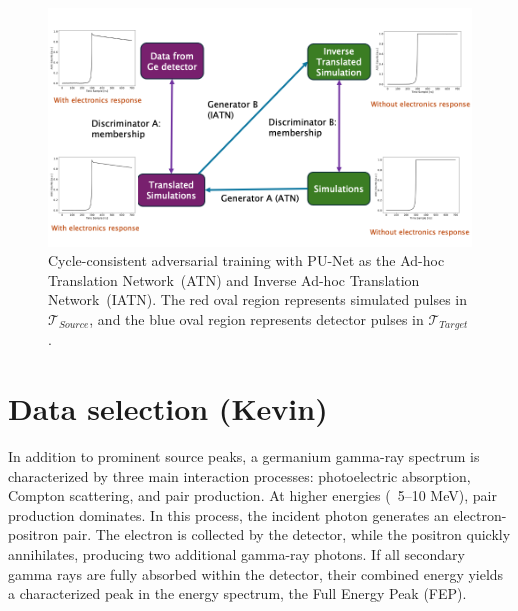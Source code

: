 \begin{figure}[htb!]
    \includegraphics[width=0.99\linewidth]{ch7/figs/cycle_gan_training.png}
    \caption{Cycle-consistent adversarial training with PU-Net as the Ad-hoc Translation Network~(ATN) and Inverse Ad-hoc Translation Network~(IATN). The red oval region represents simulated pulses in $\mathcal{T}_{Source}$, and the blue oval region represents detector pulses in $\mathcal{T}_{Target}$.}
   \label{fig:network_training}
\end{figure}





\section{Data selection (Kevin)}

In addition to prominent source peaks, a germanium gamma-ray spectrum is characterized by three main interaction processes: photoelectric absorption, Compton scattering, and pair production. At higher energies (~5–10 MeV), pair production dominates. In this process, the incident photon generates an electron-positron pair. The electron is collected by the detector, while the positron quickly annihilates, producing two additional gamma-ray photons. If all secondary gamma rays are fully absorbed within the detector, their combined energy yields a characterized peak in the energy spectrum, the Full Energy Peak (FEP).



